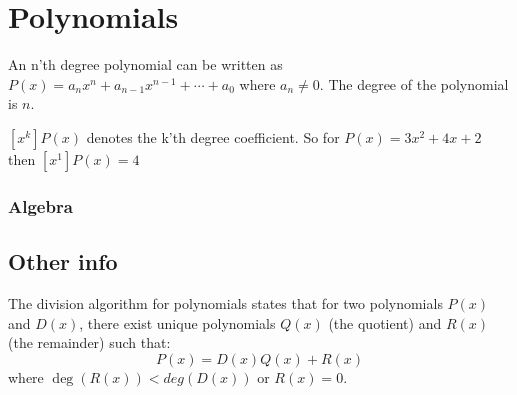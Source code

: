 \section{Polynomials}
An n'th degree polynomial can be written as $P(x)=a_n x^n + a_{n-1} x^{n-1} + \cdots + a_0$ where $a_n \neq 0$. The degree of the polynomial is $n$.

$[x^k]P(x)$ denotes the k'th degree coefficient. So for $P(x)=3x^2+4x+2$ then $[x^1]P(x) = 4$

\subsubsection{Algebra}



\subsection{Other info}
The division algorithm for polynomials states that for two polynomials \(P(x)\) and \(D(x)\), there exist unique polynomials \(Q(x)\) (the quotient) and \(R(x)\) (the remainder) such that:
\[
P(x) = D(x) Q(x) + R(x)
\]
where $\deg(R(x)) < deg(D(x))$ or $R(x) = 0$.

